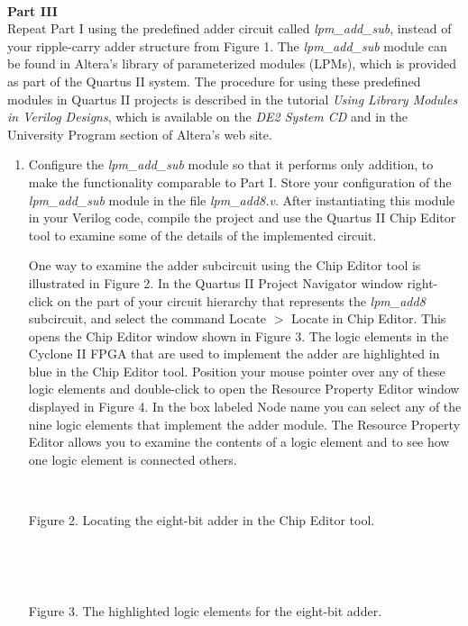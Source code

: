 \documentclass[psfig,10pt,fullpage]{article}
\begin{document}
~\\
\noindent
{\bf Part III}
~\\

\noindent
Repeat Part I using the predefined adder circuit called {\it lpm\_add\_sub}, instead of your
ripple-carry adder structure from Figure 1. The {\it lpm\_add\_sub} module can be found in
Altera's library of parameterized modules (LPMs), which is provided as part of the Quartus
II system.  The procedure for using these predefined modules in Quartus II projects 
is described in the tutorial {\it Using Library Modules in Verilog Designs}, which is available 
on the {\it DE2 System CD} and in the University Program section of Altera's web site.  
\begin{enumerate}
\item Configure the {\it lpm\_add\_sub} module so that it performs only addition, to make
the functionality comparable to Part I. Store your configuration of the {\it lpm\_add\_sub} 
module in the file {\it lpm\_add8.v}.  After instantiating this module in your 
Verilog code, compile the project and use the Quartus II Chip Editor tool to examine some 
of the details of the implemented circuit. 

One way to examine the adder subcircuit using the Chip Editor tool is illustrated in
Figure 2. In the Quartus II Project Navigator window right-click on the part of your
circuit hierarchy that represents the {\it lpm\_add8} subcircuit, and select the command
{\sf Locate} $>$ {\sf Locate in Chip Editor}. This opens the Chip Editor window 
shown in Figure 3. The logic elements in the Cyclone II FPGA that are used to implement
the adder are highlighted in blue in the Chip Editor tool.
Position your mouse pointer over any of these logic elements and double-click 
to open the Resource Property Editor window displayed in Figure 4. In the box labeled 
{\sf Node name} you can select any of the nine logic elements that implement the adder 
module. The Resource Property Editor allows you to examine the contents of a logic element and
to see how one logic element is connected others.

\begin{figure}[H]
\scriptsize
\centerline{
\hbox{}}
\end{figure}
~\\
\centerline{Figure 2.  Locating the eight-bit adder in the Chip Editor tool.}
~\\

\begin{figure}[H]
\scriptsize
\centerline{
\hbox{}}
\end{figure}
~\\
\centerline{Figure 3.  The highlighted logic elements for the eight-bit adder.}
~\\


\end{enumerate}
\end{document}
